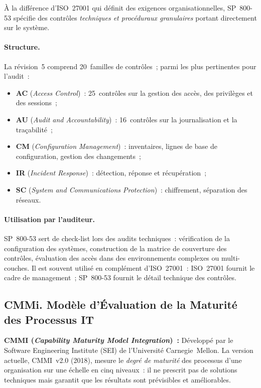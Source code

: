 À la différence d'ISO~27001 qui définit des exigences organisationnelles, SP~800-53 spécifie des
contrôles \emph{techniques et procéduraux granulaires} portant directement sur le système.

\paragraph{Structure.} La révision~5 comprend 20~familles de contrôles~; parmi les plus
pertinentes pour l'audit~:
\begin{itemize}
    \item \textbf{AC} (\emph{Access Control})~: 25~contrôles sur la gestion des accès,
        des privilèges et des sessions~;
    \item \textbf{AU} (\emph{Audit and Accountability})~: 16~contrôles sur la journalisation
        et la traçabilité~;
    \item \textbf{CM} (\emph{Configuration Management})~: inventaires, lignes de base de
        configuration, gestion des changements~;
    \item \textbf{IR} (\emph{Incident Response})~: détection, réponse et récupération~;
    \item \textbf{SC} (\emph{System and Communications Protection})~: chiffrement, séparation
        des réseaux.
\end{itemize}

\paragraph{Utilisation par l'auditeur.} SP~800-53 sert de check-list lors des audits techniques~:
vérification de la configuration des systèmes, construction de la matrice de couverture des
contrôles, évaluation des accès dans des environnements complexes ou multi-couches. Il est souvent
utilisé en complément d'ISO~27001~: ISO~27001 fournit le cadre de management~;
SP~800-53 fournit le détail technique des contrôles.

\subsection{CMMi. Modèle d'Évaluation de la Maturité des Processus IT}
\label{subsec:cmmi}

\begin{boxdef}
\textbf{CMMI (\emph{Capability Maturity Model Integration})~:} Développé par le Software
Engineering Institute (SEI) de l'Université Carnegie~Mellon. La version actuelle,
CMMI~v2.0 (2018), mesure le \emph{degré de maturité} des processus d'une organisation sur
une échelle en cinq niveaux~: il ne prescrit pas de solutions techniques mais garantit que les
résultats sont prévisibles et améliorables.
\end{boxdef}

